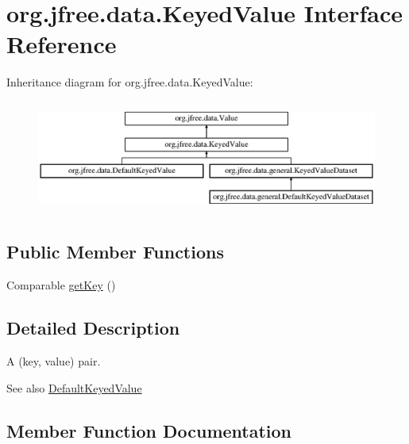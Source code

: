 \hypertarget{interfaceorg_1_1jfree_1_1data_1_1_keyed_value}{}\section{org.\+jfree.\+data.\+Keyed\+Value Interface Reference}
\label{interfaceorg_1_1jfree_1_1data_1_1_keyed_value}
Inheritance diagram for org.\+jfree.\+data.\+Keyed\+Value\+:\begin{figure}[H]
\begin{center}
\leavevmode
\includegraphics[height=3.745819cm]{interfaceorg_1_1jfree_1_1data_1_1_keyed_value}
\end{center}
\end{figure}
\subsection*{Public Member Functions}
\begin{DoxyCompactItemize}
\item 
Comparable \mbox{\hyperlink{interfaceorg_1_1jfree_1_1data_1_1_keyed_value_a82fdfea065ff97bd253b44bb89069970}{get\+Key}} ()
\end{DoxyCompactItemize}


\subsection{Detailed Description}
A (key, value) pair.

\begin{DoxySeeAlso}{See also}
\mbox{\hyperlink{classorg_1_1jfree_1_1data_1_1_default_keyed_value}{Default\+Keyed\+Value}} 
\end{DoxySeeAlso}


\subsection{Member Function Documentation}
\mbox{\label{interfaceorg_1_1jfree_1_1data_1_1_keyed_value_a82fdfea065ff97bd253b44bb89069970}} 
